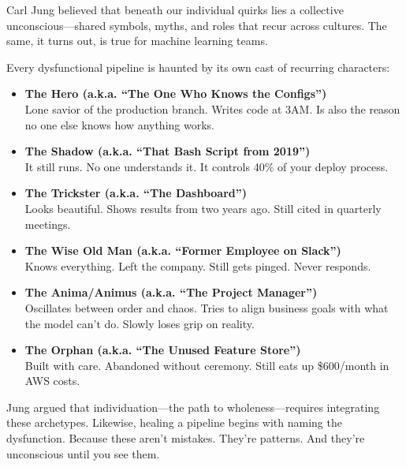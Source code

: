 \begin{tcolorbox}[
  title=Jungian Archetypes and the Data Team Unconscious,
  colback=gray!5,
  colframe=black,
  fonttitle=\bfseries,
  sharp corners=south,
  boxrule=0.5pt,
  enhanced,
  breakable
]
Carl Jung believed that beneath our individual quirks lies a collective unconscious—shared symbols, myths, and roles that recur across cultures. The same, it turns out, is true for machine learning teams.

Every dysfunctional pipeline is haunted by its own cast of recurring characters:

\begin{itemize}
  \item \textbf{The Hero (a.k.a. “The One Who Knows the Configs”)}\\
  Lone savior of the production branch. Writes code at 3AM. Is also the reason no one else knows how anything works.

  \item \textbf{The Shadow (a.k.a. “That Bash Script from 2019”)}\\
  It still runs. No one understands it. It controls 40\% of your deploy process.

  \item \textbf{The Trickster (a.k.a. “The Dashboard”)}\\
  Looks beautiful. Shows results from two years ago. Still cited in quarterly meetings.

  \item \textbf{The Wise Old Man (a.k.a. “Former Employee on Slack”)}\\
  Knows everything. Left the company. Still gets pinged. Never responds.

  \item \textbf{The Anima/Animus (a.k.a. “The Project Manager”)}\\
  Oscillates between order and chaos. Tries to align business goals with what the model can’t do. Slowly loses grip on reality.

  \item \textbf{The Orphan (a.k.a. “The Unused Feature Store”)}\\
  Built with care. Abandoned without ceremony. Still eats up \$600/month in AWS costs.
\end{itemize}

Jung argued that individuation—the path to wholeness—requires integrating these archetypes. Likewise, healing a pipeline begins with naming the dysfunction. Because these aren’t mistakes. They’re patterns. And they’re unconscious until you see them.
\end{tcolorbox}

